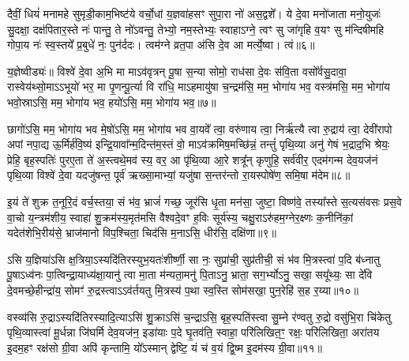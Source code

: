 {\anuvakamend[{मा॒ योनि॑रसि त्रि॒ꣳ॒शच्च॑॥२॥}]}

दैवीं॒ धियं॑ मनामहे सुमृडी॒काम॒भिष्ट॑ये वर्चो॒धां य॒ज्ञवा॑हसꣳ सुपा॒रा नो॑ अस॒द्वशे᳚। ये दे॒वा मनो॑जाता मनो॒युजः॑ सु॒दक्षा॒ दक्ष॑पितार॒स्ते नः॑ पान्तु॒ ते नो॑\-ऽवन्तु॒ तेभ्यो॒ नम॒स्तेभ्यः॒ स्वाहा\-ऽग्ने॒ त्वꣳ सु जा॑गृहि व॒यꣳ सु म॑न्दिषीमहि गोपा॒य नः॑ स्व॒स्तये᳚ प्र॒बुधे॑ नः॒ पुन॑र्ददः। त्वम॑ग्ने व्रत॒पा अ॑सि दे॒व आ मर्त्ये॒ष्वा। त्वं॥६॥

य॒ज्ञेष्वीड्यः॑॥ विश्वे॑ दे॒वा अ॒भि मा मा\-ऽव॑वृत्रन् पू॒षा स॒न्या सोमो॒ राध॑सा दे॒वः स॑वि॒ता वसो᳚र्वसु॒दावा॒ रास्वेय॑थ्सो॒मा\-ऽ\-ऽभूयो॑ भर॒ मा पृ॒णन्पू॒र्त्या वि रा॑धि॒ मा\-ऽहमायु॑षा च॒न्द्रम॑सि॒ मम॒ भोगा॑य भव॒ वस्त्र॑मसि॒ मम॒ भोगा॑य भवो॒स्रा\-ऽसि॒ मम॒ भोगा॑य भव॒ हयो॑\-ऽसि॒ मम॒ भोगा॑य भव॒॥७॥

छागो॑\-ऽसि॒ मम॒ भोगा॑य भव मे॒षो॑\-ऽसि॒ मम॒ भोगा॑य भव वा॒यवे᳚ त्वा॒ वरु॑णाय त्वा॒ निर्\mbox{}ऋ॑त्यै त्वा रु॒द्राय॑ त्वा॒ देवी॑रापो अपां नपा॒द्य ऊ॒र्मिर्\mbox{}ह॑वि॒ष्य॑ इन्द्रि॒यावा᳚न्म॒दिन्त॑म॒स्तं वो॒ मा\-ऽव॑क्रमिष॒मच्छि॑न्नं॒ तन्तुं॑ पृथि॒व्या अनु॑ गेषं भ॒द्राद॒भि श्रेयः॒ प्रेहि॒ बृह॒स्पतिः॑ पुरए॒ता ते॑ अ॒स्त्वथे॒मव॑ स्य॒ वर॒ आ पृ॑थि॒व्या आ॒रे शत्रू᳚न् कृणुहि॒ सर्व॑वीर॒ एदम॑गन्म देव॒यज॑नं पृथि॒व्या विश्वे॑ दे॒वा यदजु॑षन्त॒ पूर्व॑ ऋख्सा॒माभ्यां॒ यजु॑षा स॒न्तर॑न्तो रा॒यस्पोषे॑ण॒ समि॒षा म॑देम॥८॥

{\anuvakamend[{आ त्वꣳ हयो॑\-ऽसि॒ मम॒ भोगा॑य भव स्य॒ पञ्च॑विꣳशतिश्च॥३॥}]}

इ॒यं ते॑ शुक्र त॒नूरि॒दं वर्च॒स्तया॒ सं भ॑व॒ भ्राजं॑ गच्छ॒ जूर॑सि धृ॒ता मन॑सा॒ जुष्टा॒ विष्ण॑वे॒ तस्या᳚स्ते स॒त्यस॑वसः प्रस॒वे वा॒चो य॒न्त्रम॑शीय॒ स्वाहा॑ शु॒क्रम॑स्य॒मृत॑मसि वैश्वदे॒वꣳ ह॒विः सूर्य॑स्य॒ चक्षु॒रा\-ऽरु॑हम॒ग्नेर॒क्ष्णः क॒नीनि॑कां॒ यदेत॑शेभि॒रीय॑से॒ भ्राज॑मानो विप॒श्चिता॒ चिद॑सि म॒ना\-ऽसि॒ धीर॑सि॒ दक्षि॑णा॥९॥

ऽसि य॒ज्ञिया॑\-ऽसि क्ष॒त्रिया॒\-ऽस्यदि॑तिरस्युभ॒यतः॑शीर्ष्णी॒ सा नः॒ सुप्रा॑ची॒ सुप्र॑तीची॒ सं भ॑व मि॒त्रस्त्वा॑ प॒दि ब॑ध्नातु पू॒षा\-ऽध्व॑नः पा॒त्विन्द्रा॒याध्य॑क्षा॒यानु॑ त्वा मा॒ता म॑न्यता॒मनु॑ पि॒ता\-ऽनु॒ भ्राता॒ सग॒र्भ्यो\-ऽनु॒ सखा॒ सयू᳚थ्यः॒ सा दे॑वि दे॒वमच्छे॒हीन्द्रा॑य॒ सोमꣳ॑ रु॒द्रस्त्वा\-ऽ\-ऽव॑र्तयतु मि॒त्रस्य॑ प॒था स्व॒स्ति सोम॑सखा॒ पुन॒रेहि॑ स॒ह र॒य्या॥१०॥

{\anuvakamend[{दक्षि॑णा॒ सोम॑सखा॒ पञ्च॑ च॥४॥}]}

वस्व्य॑सि रु॒द्रा\-ऽस्यदि॑तिरस्यादि॒त्या\-ऽसि॑ शु॒क्रा\-ऽसि॑ च॒न्द्रा\-ऽसि॒ बृह॒स्पति॑स्त्वा सु॒म्ने र॑ण्वतु रु॒द्रो वसु॑भि॒रा चि॑केतु पृथि॒व्यास्त्वा॑ मू॒र्धन्ना जि॑घर्मि देव॒यज॑न॒ इडा॑याः प॒दे घृ॒तव॑ति॒ स्वाहा॒ परि॑लिखित॒ꣳ॒ रक्षः॒ परि॑लिखिता॒ अरा॑तय इ॒दम॒हꣳ रक्ष॑सो ग्री॒वा अपि॑ कृन्तामि॒ यो᳚\-ऽस्मान् द्वेष्टि॒ यं च॑ व॒यं द्वि॒ष्म इ॒दम॑स्य ग्री॒वा॥११॥


